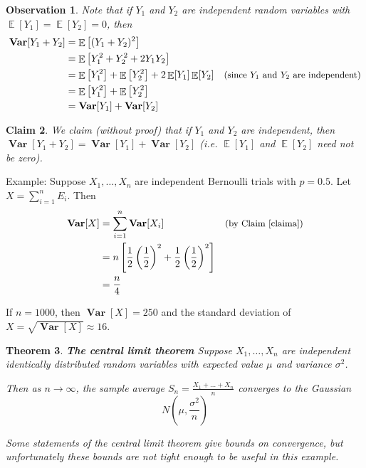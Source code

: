 \documentclass[11pt]{article}
\DeclareMathOperator*{\E}{\mathbb{E}}
\DeclareMathOperator*{\var}{\mathbf{Var}}
\newtheorem{theorem}{Theorem}
\newtheorem{observation}[theorem]{Observation}
\newtheorem{claim}[theorem]{Claim}
\begin{document}
\begin{observation}
Note that if $Y_1$ and $Y_2$ are independent random variables with $\E[Y_1] = \E[Y_2] = 0$, then
\begin{align*}
  \var[Y_1 + Y_2] &= \E\left[(Y_1 + Y_2)^2\right] \\
                  &= \E\left[Y_1^2 + Y_2^2 + 2Y_1Y_2\right] \\
                  &= \E\left[Y_1^2\right] + \E\left[Y_2^2\right] + 2\E[Y_1]\E[Y_2] &\small\text{(since $Y_1$ and $Y_2$ are independent)}\\
                  &= \E\left[Y_1^2\right] + \E\left[Y_2^2\right] \\
                  &= \var[Y_1] + \var[Y_2]
\end{align*}
\end{observation}

\begin{claim}\label{claima}
We claim (without proof) that if $Y_1$ and $Y_2$ are independent, then $\var[Y_1 + Y_2] = \var[Y_1] + \var[Y_2]$ (i.e. $\E[Y_1]$ and $\E[Y_2]$ need not be zero).
\end{claim}

Example: Suppose $X_1,\dots,X_n$ are independent Bernoulli trials with $p=0.5$. Let $X = \sum_{i=1}^n E_i$. Then
\begin{align*}
  \var[X] &= \sum_{i=1}^n \var[X_i] &\small\text{(by Claim \ref{claima})}\\
          &= n\left[ \frac12 \left(\frac12\right)^2 + \frac12 \left(\frac12\right)^2 \right] \\
          &= \frac{n}{4}
\end{align*}

If $n=1000$, then $\var[X] = 250$ and the standard deviation of $X = \sqrt{\var[X]} \approx 16$.

\begin{theorem}
  \textbf{The central limit theorem}
  Suppose $X_1,\dots,X_n$ are independent identically distributed random variables with expected value $\mu$ and variance $\sigma^2$.

  Then as $n \to \infty$, the sample average $S_n = \frac{X_1 + \dots + X_n}{n}$ converges to the Gaussian
  $$ N\left(\mu, \frac{\sigma^2}{n}\right) $$

  Some statements of the central limit theorem give bounds on convergence, but unfortunately these bounds are not tight enough to be useful in this example.
\end{theorem}
\end{document}
